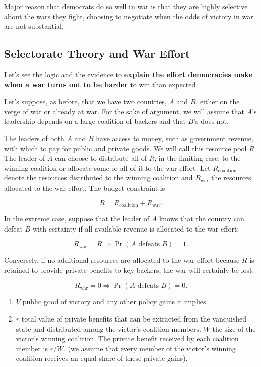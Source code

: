 Major reason that democrats do so well in war is that they are highly selective about the wars they fight, choosing to negotiate when the odds of victory in war are not substantial.

\subsection{Selectorate Theory and War Effort}
Let's see the logic and the evidence to \textbf{explain the effort democracies make when a war turns out to be harder} to win than expected.

Let's suppose, as before, that we have two countries, $A$ and $B$, either on the verge of war or already at war. For the sake of argument, we will assume that $A$'s leadership depends on a large coalition of backers and that $B$'s does not.

The leaders of both $A$ and $B$ have access to money, such as government revenue, with which to pay for public and private goods. We will call this resource pool $R$. The leader of $A$ can choose to distribute all of $R$, in the limiting case, to the winning coalition or allocate some or all of it to the war effort. Let $R_{\mathrm{coalition}}$ denote the resources distributed to the winning coalition and $R_{\mathrm{war}}$ the resources allocated to the war effort. The budget constraint is

\begin{equation}
    R = R_{\mathrm{coalition}} + R_{\mathrm{war}}.
\end{equation}

In the extreme case, suppose that the leader of $A$ knows that the country can defeat $B$ with certainty if all available revenue is allocated to the war effort:

\begin{equation}
    R_{\mathrm{war}} = R \Rightarrow \Pr(A \text{ defeats } B) = 1.
\end{equation}

Conversely, if no additional resources are allocated to the war effort because $R$ is retained to provide private benefits to key backers, the war will certainly be lost:

\begin{equation}
    R_{\mathrm{war}} = 0 \Rightarrow \Pr(A \text{ defeats } B) = 0.
\end{equation}
\begin{enumerate}
    \item $V$ public good of victory and any other policy gains it implies.
    \item $r$ total value of private benefits that can be extracted from the vanquished state and distributed among the victor's coalition members. $W$ the size of the victor's winning coalition. The private benefit received by each coalition member is $r \slash W$. (we assume that every member of the victor's winning coalition receives an equal share of these private gains).
\end{enumerate}

